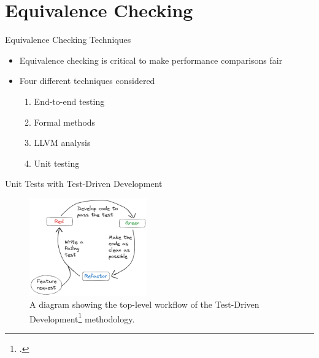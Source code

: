\documentclass[10pt,aspectratio=169]{beamer}
\begin{document}
\section{Equivalence Checking}

\begin{frame}{Equivalence Checking Techniques}
    \begin{itemize}
        \item Equivalence checking is critical to make performance comparisons fair
        \vspace*{0.5cm}
        \item Four different techniques considered
        \begin{enumerate}
            \item \alert<2>{End-to-end testing}
            \item Formal methods
            \item LLVM analysis
            \item \alert<2>{Unit testing}
        \end{enumerate}
    \end{itemize}
\end{frame}

\begin{frame}{Unit Tests with Test-Driven Development}
    \begin{figure}[H]
        \hspace*{-1cm}
        \includegraphics[width=0.45\textwidth]{images/excalidraw_tdd.png}
        \caption{A diagram showing the top-level workflow of the Test-Driven Development\footcite{beckTestDrivenDevelopment2022} methodology.}
        \label{fig:tdd_workflow}
    \end{figure}
\end{frame}
\end{document}
